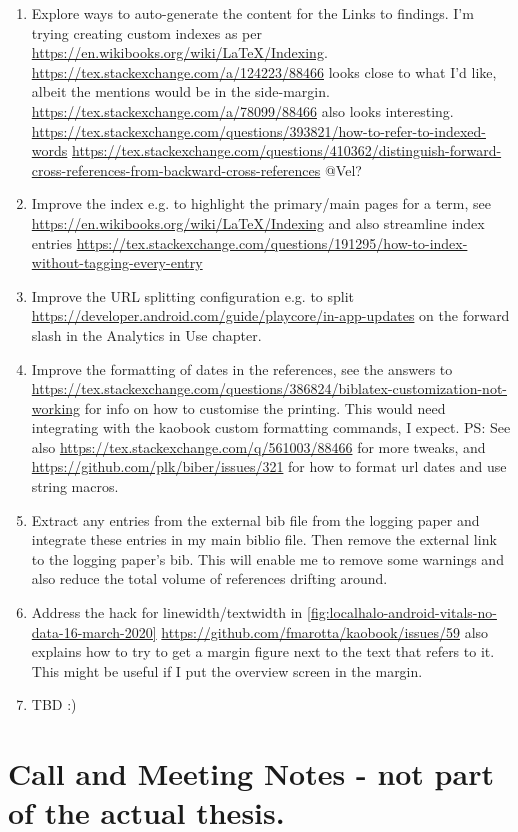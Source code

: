 \begin{enumerate}
    \item Explore ways to auto-generate the content for the Links to findings. I'm trying creating custom indexes as per \url{https://en.wikibooks.org/wiki/LaTeX/Indexing}. \url{https://tex.stackexchange.com/a/124223/88466} looks close to what I'd like, albeit the mentions would be in the side-margin. \url{https://tex.stackexchange.com/a/78099/88466} also looks interesting. \url{https://tex.stackexchange.com/questions/393821/how-to-refer-to-indexed-words} \url{https://tex.stackexchange.com/questions/410362/distinguish-forward-cross-references-from-backward-cross-references} @Vel?
    
    \item Improve the index e.g. to highlight the primary/main pages for a term, see \url{https://en.wikibooks.org/wiki/LaTeX/Indexing} and also streamline index entries \url{https://tex.stackexchange.com/questions/191295/how-to-index-without-tagging-every-entry}
    
    \item Improve the URL splitting configuration e.g. to split \url{https://developer.android.com/guide/playcore/in-app-updates} on the forward slash in the Analytics in Use chapter.
    
    \item Improve the formatting of dates in the references, see the answers to \url{https://tex.stackexchange.com/questions/386824/biblatex-customization-not-working} for info on how to customise the printing. This would need integrating with the kaobook custom formatting commands, I expect. PS: See also \url{https://tex.stackexchange.com/q/561003/88466} for more tweaks, and \url{https://github.com/plk/biber/issues/321} for how to format url dates and use string macros.
    
    \item Extract any entries from the external bib file from the logging paper and integrate these entries in my main biblio file. Then remove the external link to the logging paper's bib. This will enable me to remove some warnings and also reduce the total volume of references drifting around.
    
    \item Address the hack for linewidth/textwidth in \ref{fig:localhalo-android-vitals-no-data-16-march-2020}
    \url{https://github.com/fmarotta/kaobook/issues/59} also explains how to try to get a margin figure next to the text that refers to it. This might be useful if I put the overview screen in the margin.
    
    \item TBD :)

\end{enumerate}

\clearpage
\section{Call and Meeting Notes - not part of the actual thesis.}

